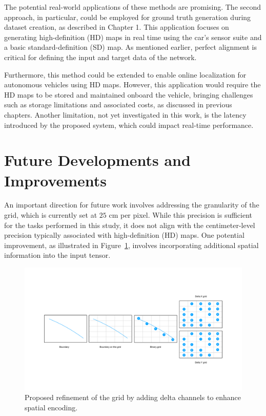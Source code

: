 The potential real-world applications of these methods are promising. The second approach, in particular, could be employed for ground truth generation during dataset creation, as described in Chapter 1. This application focuses on generating high-definition (HD) maps in real time using the car’s sensor suite and a basic standard-definition (SD) map. As mentioned earlier, perfect alignment is critical for defining the input and target data of the network.

Furthermore, this method could be extended to enable online localization for autonomous vehicles using HD maps. However, this application would require the HD maps to be stored and maintained onboard the vehicle, bringing challenges such as storage limitations and associated costs, as discussed in previous chapters. Another limitation, not yet investigated in this work, is the latency introduced by the proposed system, which could impact real-time performance.


\section{Future Developments and Improvements}

An important direction for future work involves addressing the granularity of the grid, which is currently set at $25$ cm per pixel. While this precision is sufficient for the tasks performed in this study, it does not align with the centimeter-level precision typically associated with high-definition (HD) maps. One potential improvement, as illustrated in Figure~\ref{fig:grid}, involves incorporating additional spatial information into the input tensor.

\begin{figure}[H]
    \centering
    \includegraphics[width=1\linewidth]{LateX//figs/GRID.pdf}
    \caption{Proposed refinement of the grid by adding delta channels to enhance spatial encoding.}
    \label{fig:grid}
\end{figure}


